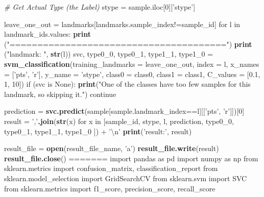 \documentclass[10pt,letterpaper]{article}
\newenvironment{Shaded}{\begin{snugshade}}{\end{snugshade}}
\newcommand{\KeywordTok}[1]{\textcolor[rgb]{0.13,0.29,0.53}{\textbf{#1}}}
\newcommand{\DataTypeTok}[1]{\textcolor[rgb]{0.13,0.29,0.53}{#1}}
\newcommand{\DecValTok}[1]{\textcolor[rgb]{0.00,0.00,0.81}{#1}}
\newcommand{\FloatTok}[1]{\textcolor[rgb]{0.00,0.00,0.81}{#1}}
\newcommand{\CharTok}[1]{\textcolor[rgb]{0.31,0.60,0.02}{#1}}
\newcommand{\StringTok}[1]{\textcolor[rgb]{0.31,0.60,0.02}{#1}}
\newcommand{\ImportTok}[1]{#1}
\newcommand{\CommentTok}[1]{\textcolor[rgb]{0.56,0.35,0.01}{\textit{#1}}}
\newcommand{\NormalTok}[1]{#1}
\begin{document}
\begin{Shaded}
\begin{Highlighting}[]
    \CommentTok{# Get Actual Type (the Label)}
    \NormalTok{stype =}\StringTok{ }\NormalTok{sample.iloc[}\DecValTok{0}\NormalTok{][}\StringTok{'stype'}\NormalTok{]}

    \NormalTok{leave_one_out =}\StringTok{ }\NormalTok{landmarks[landmarks.sample_index!=sample_id]}
    \NormalTok{for l in landmark_ids.values:}
\StringTok{        }\KeywordTok{print} \NormalTok{(}\StringTok{"======================================="}\NormalTok{)}
        \KeywordTok{print} \NormalTok{(}\StringTok{"landmark: "}\NormalTok{, }\KeywordTok{str}\NormalTok{(l))}
        \NormalTok{svc, type0_0, type0_1, type1_1, type1_0 =}
\StringTok{            }\KeywordTok{svm_classification}\NormalTok{(}\DataTypeTok{training_landmarks =} \NormalTok{leave_one_out,}
                                                 \DataTypeTok{index =} \NormalTok{l,}
                                                 \DataTypeTok{x_names =} \NormalTok{[}\StringTok{'pts'}\NormalTok{, }\StringTok{'r'}\NormalTok{],}
                                                 \DataTypeTok{y_name =} \StringTok{'stype'}\NormalTok{,}
                                                 \DataTypeTok{class0 =} \NormalTok{class0,}
                                                 \DataTypeTok{class1 =} \NormalTok{class1,}
                                                 \DataTypeTok{C_values =} \NormalTok{[}\FloatTok{0.1}\NormalTok{, }\DecValTok{1}\NormalTok{, }\DecValTok{10}\NormalTok{])}
        \NormalTok{if (svc is None):}
\StringTok{            }\KeywordTok{print}\NormalTok{(}\StringTok{"One of the classes have too few samples}
\StringTok{                for this landmark, so skipping it."}\NormalTok{)}
            \NormalTok{continue}

        \NormalTok{prediction =}
\StringTok{            }\KeywordTok{svc.predict}\NormalTok{(sample[sample.landmark_index==l][[}\StringTok{'pts'}\NormalTok{, }\StringTok{'r'}\NormalTok{]])[}\DecValTok{0}\NormalTok{]}
        \NormalTok{result =}\StringTok{ ','}\KeywordTok{.join}\NormalTok{(}\KeywordTok{str}\NormalTok{(x) for x in [sample_id, stype, l, prediction,}
            \NormalTok{type0_0, type0_1, type1_1, type1_0 ]) +}\StringTok{ '}\CharTok{\textbackslash{}n}\StringTok{'}
        \KeywordTok{print}\NormalTok{(}\StringTok{'result:'}\NormalTok{, result)}

        \NormalTok{result_file =}\StringTok{ }\KeywordTok{open}\NormalTok{(result_file_name, }\StringTok{'a'}\NormalTok{)}
        \KeywordTok{result_file.write}\NormalTok{(result)}
        \KeywordTok{result_file.close}\NormalTok{()}
=======
\ImportTok{import}\NormalTok{ pandas }\ImportTok{as}\NormalTok{ pd}
\ImportTok{import}\NormalTok{ numpy }\ImportTok{as}\NormalTok{ np}
\ImportTok{from}\NormalTok{ sklearn.metrics }\ImportTok{import}\NormalTok{ confusion_matrix, classification_report}
\ImportTok{from}\NormalTok{ sklearn.model_selection }\ImportTok{import}\NormalTok{ GridSearchCV}
\ImportTok{from}\NormalTok{ sklearn.svm }\ImportTok{import}\NormalTok{ SVC}
\ImportTok{from}\NormalTok{ sklearn.metrics }\ImportTok{import}\NormalTok{ f1_score, precision_score, recall_score}


\end{Highlighting}
\end{Shaded}
\end{document}
